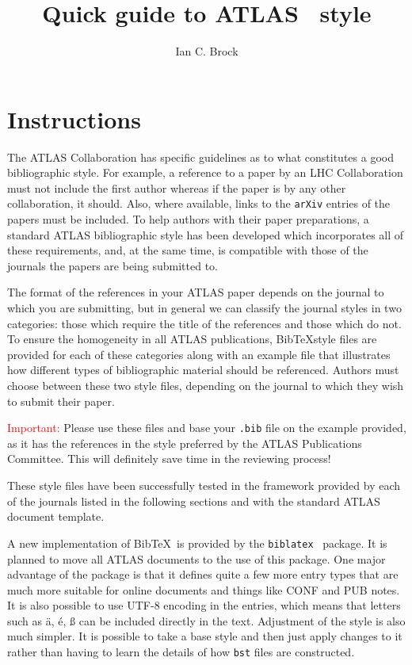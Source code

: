 \documentclass[UKenglish]{latex/atlasdoc}
\title{Quick guide to ATLAS \BibTeX\ style}
\author{Ian C. Brock}
\affil{University of Bonn}
\newcommand*{\BibTeX}{Bib\TeX}
\begin{document}
 


\section{Instructions}

The ATLAS Collaboration has specific guidelines as to what constitutes a good bibliographic style. 
For example, a reference to a paper by an LHC Collaboration must not include the first author whereas if the paper is by any other collaboration, it should. 
Also, where available, links to the \texttt{arXiv} entries of the papers must be included. 
To help authors with their paper preparations, a standard ATLAS bibliographic style has been developed which incorporates all of these requirements, 
and, at the same time, is compatible with those of the journals the papers are being submitted to. 

The format of the references in your ATLAS paper depends on the journal to which you are submitting,
but in general we can classify the journal styles in two categories: those which require the title of the references and those which do not. 
To ensure the homogeneity in all ATLAS publications, 
\BibTeX style files are provided for each of these categories along with an example file that illustrates how different types of bibliographic material should be referenced.
Authors must choose between these two style files, depending on the journal to which they wish to submit their paper.

\textcolor{red}{Important:} Please use these files and base your \texttt{.bib} file on the example provided,
as it has the references in the style preferred by the ATLAS Publications Committee.
This will definitely save time in the reviewing process!

These style files have been successfully tested in the framework provided by each of the journals listed in the following sections and with the standard ATLAS document template.

A new implementation of \BibTeX\ is provided by the \texttt{biblatex}~\cite{biblatex} package.
It is planned to move all ATLAS documents to the use of this package.
One major advantage of the package is that it defines quite a few more entry types
that are much more suitable for online documents and things like CONF and PUB notes.
It is also possible to use UTF-8 encoding in the entries, which means that letters such as
ä, é, ß can be included directly in the text.
Adjustment of the style is also much simpler.
It is possible to take a base style and then just apply changes to it rather than
having to learn the details of how \texttt{bst} files are constructed.
\end{document}
